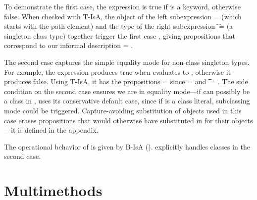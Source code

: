 To demonstrate the first \isacompareliteral{} case,
the expression
\isaapp{\appexp{\classconst{}}{\x{}}}{\Keyword}
is true if \x{} is a keyword, otherwise false.
When checked with T-IsA,
the object of the left subexpression \object{} = {\pth{\classpe{}}{\x{}}}
(which starts with the {\classpe{}} path element)
and the type of the right subexpression \t{} = {\Value{\Keyword}} (a singleton class type)
together trigger the first \isacompareliteral{} case
\isacompare{\s{}}{\pth{\classpe{}}{\x{}}}{\Value{\Keyword}}{\filterset{\isprop{\Keyword}{\x{}}}{\notprop{\Keyword}{\x{}}}},
giving propositions that correspond to our informal description {\filterset{\thenprop{\prop{}}}{\elseprop{\prop{}}}} = {\filterset{\isprop{\Keyword}{\x{}}}{\notprop{\Keyword}{\x{}}}}.

The second \isacompareliteral{} case captures the simple equality mode for non-class singleton types.
For example,
the expression
 produces true 
when \x{} evaluates to {}, otherwise it produces false.
Using T-IsA,
it has the propositions {\filterset{\thenprop{\prop{}}}{\elseprop{\prop{}}}} = 
since \object{} = {\x{}} and \t{} = {}.
%
The side condition on the second \isacompareliteral{} case ensures we are in equality mode---if \x{} can possibly be a class in 
\isaapp{\x{}}{\Object{}}, \isacompareliteral{} uses its conservative default case,
since if \x{} is a class literal, subclassing mode could be triggered.
%
Capture-avoiding substitution of objects {\replacefor {} {\object{}} {\x{}}} used in this case erases propositions
that would otherwise have \emptyobject{} substituted in for their objects---it
is defined in the appendix.

The operational behavior of \isaliteral{} is given by B-IsA (). \isaopsemliteral{} explicitly handles classes in the second case.



\section{Multimethods}

